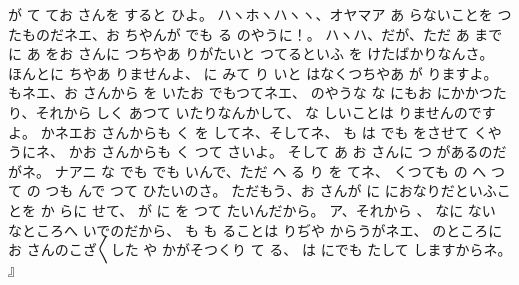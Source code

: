 が
て
てお
さんを
すると
ひよ。
ハヽホヽハヽヽ、オヤマア
あ
らないことを
つたものだネエ、お
ちやんが
でも
る
のやうに！。
ハヽハ、だが、ただ
あ
までに
あ
をお
さんに
つちやあ
りがたいと
つてるといふ
を
けたばかりなんさ。
ほんとに
ちやあ
りませんよ、
に
みて
り
いと
はなくつちやあ
が
りますよ。
もネエ、お
さんから
を
いたお
でもつてネエ、
のやうな
な
にもお
にかかつたり、それから
しく
あつて
いたりなんかして、
な
しいことは
りませんのですよ。
かネエお
さんからも
く
を
してネ、そしてネ、
も
は
でも
をさせて
くやうにネ、
かお
さんからも
く
つて
さいよ。
そして
あ
お
さんに
つ
があるのだがネ。
ナアニ
な
でも
でも
いんで、ただ
へ
る
り
を
てネ、
くつても
の
へ
つて
の
つも
んで
つて
ひたいのさ。
ただもう、お
さんが
に
におなりだといふことを
か
らに
せて、
が
に
を
つて
たいんだから。
ア、それから
、
なに
ない
なところへ
いでのだから、
も
も
ることは
りぢや
からうがネエ、
のところにお
さんのこざ〳〵した
や
かがそつくり
て
る、
は
にでも
たして
しますからネ。
』

